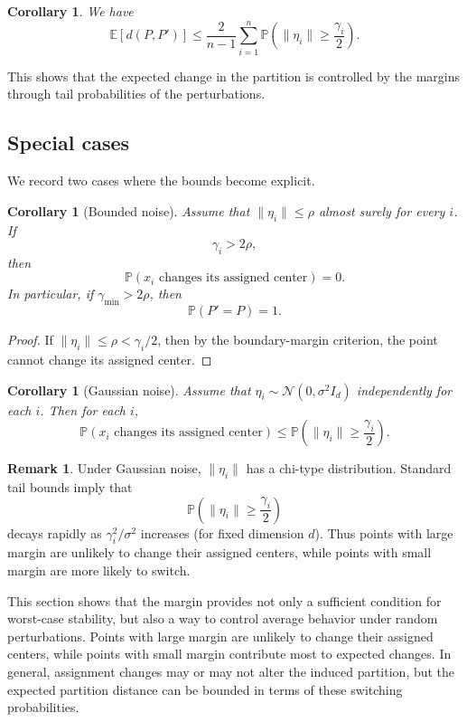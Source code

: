 \documentclass[11pt]{amsart}
\theoremstyle{plain}
\newtheorem{corollary}[subsection]{Corollary}
\theoremstyle{definition}
\newtheorem{remark}[subsection]{Remark}
\begin{document}
\begin{corollary}
We have
\[
\mathbb{E}[d(P,P')] \le \frac{2}{n-1} 
\sum_{i=1}^n \mathbb{P}\!\left( \|\eta_i\| \ge \frac{\gamma_i}{2} \right).
\]
\end{corollary}

This shows that the expected change in the partition is controlled by the margins through tail probabilities of the perturbations.

\subsection{Special cases}

We record two cases where the bounds become explicit.

\begin{corollary}[Bounded noise]
Assume that $\|\eta_i\| \le \rho$ almost surely for every $i$. If
\[
\gamma_i > 2\rho,
\]
then
\[
\mathbb{P}(\text{$x_i$ changes its assigned center}) = 0.
\]
In particular, if $\gamma_{\min} > 2\rho$, then
\[
\mathbb{P}(P' = P) = 1.
\]
\end{corollary}

\begin{proof}
If $\|\eta_i\| \le \rho < \gamma_i/2$, then by the boundary-margin criterion, the point cannot change its assigned center.
\end{proof}

\begin{corollary}[Gaussian noise]
Assume that $\eta_i \sim \mathcal{N}(0, \sigma^2 I_d)$ independently for each $i$. Then for each $i$,
\[
\mathbb{P}(\text{$x_i$ changes its assigned center}) 
\le \mathbb{P}\!\left( \|\eta_i\| \ge \frac{\gamma_i}{2} \right).
\]
\end{corollary}

\begin{remark}
Under Gaussian noise, $\|\eta_i\|$ has a chi-type distribution. Standard tail bounds imply that
\[
\mathbb{P}\!\left( \|\eta_i\| \ge \frac{\gamma_i}{2} \right)
\]
decays rapidly as $\gamma_i^2 / \sigma^2$ increases (for fixed dimension $d$). Thus points with large margin are unlikely to change their assigned centers, while points with small margin are more likely to switch.
\end{remark}

This section shows that the margin provides not only a sufficient condition for worst-case stability, but also a way to control average behavior under random perturbations. Points with large margin are unlikely to change their assigned centers, while points with small margin contribute most to expected changes. In general, assignment changes may or may not alter the induced partition, but the expected partition distance can be bounded in terms of these switching probabilities.
\end{document}
